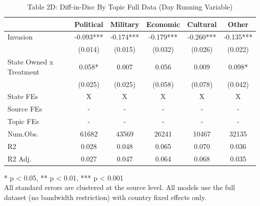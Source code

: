 \begin{table}[!t]
\caption{Table 2D: Diff-in-Disc By Topic Full Data (Day Running Variable)} 
\fontsize{12.0pt}{14.4pt}\selectfont
\begin{tabular*}{\linewidth}{@{\extracolsep{\fill}}lccccc}
\toprule
  & Political & Military & Economic & Cultural & Other \\ 
\midrule\addlinespace[2.5pt]
Invasion & -0.093*** & -0.174*** & -0.179*** & -0.260*** & -0.135*** \\ 
 & (0.014) & (0.015) & (0.032) & (0.026) & (0.022) \\ 
State Owned x Treatment & 0.058* & 0.007 & 0.056 & 0.009 & 0.098* \\ 
{} & {(0.025)} & {(0.025)} & {(0.058)} & {(0.078)} & {(0.042)} \\ 
State FEs & X & X & X & X & X \\ 
Source FEs & - & - & - & - & - \\ 
Topic FEs & - & - & - & - & - \\ 
Num.Obs. & 61682 & 43569 & 26241 & 10467 & 32135 \\ 
R2 & 0.028 & 0.048 & 0.065 & 0.070 & 0.036 \\ 
R2 Adj. & 0.027 & 0.047 & 0.064 & 0.068 & 0.035 \\ 
\bottomrule
\end{tabular*}
\begin{minipage}{\linewidth}
* p < 0.05, ** p < 0.01, *** p < 0.001\\
All standard errors are clustered at the source level. All models use the full
dataset (no bandwidth restriction) with country fixed effects only.\\
\end{minipage}
\end{table}

